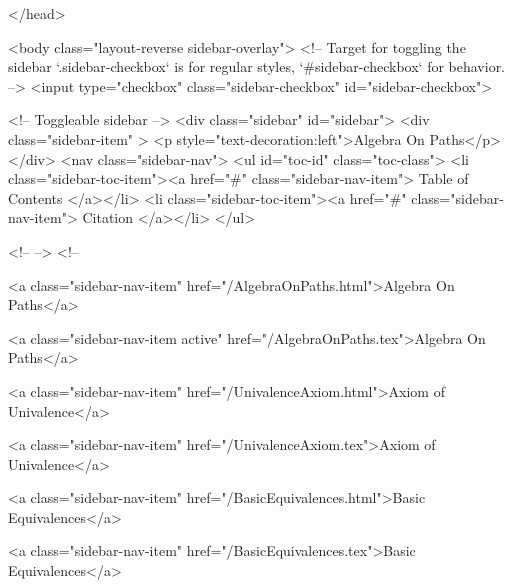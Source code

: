   
</head>




  <body class="layout-reverse sidebar-overlay">
    <!-- Target for toggling the sidebar `.sidebar-checkbox` is for regular
     styles, `#sidebar-checkbox` for behavior. -->
<input type="checkbox" class="sidebar-checkbox" id="sidebar-checkbox">

<!-- Toggleable sidebar -->
<div class="sidebar" id="sidebar">
  <div class="sidebar-item" >
    <p style="text-decoration:left">Algebra On Paths</p>
  </div>
  <nav class="sidebar-nav">
    <ul id="toc-id" class="toc-class">
  <li class="sidebar-toc-item"><a href="#" class="sidebar-nav-item"> Table of Contents </a></li>
  <li class="sidebar-toc-item"><a href="#" class="sidebar-nav-item"> Citation </a></li>
</ul>


    <!--  -->
    <!-- 
      
    
      
    
      
    
      
    
      
        
      
    
      
        
          <a class="sidebar-nav-item" href="/AlgebraOnPaths.html">Algebra On Paths</a>
        
      
    
      
        
          <a class="sidebar-nav-item active" href="/AlgebraOnPaths.tex">Algebra On Paths</a>
        
      
    
      
        
          <a class="sidebar-nav-item" href="/UnivalenceAxiom.html">Axiom of Univalence</a>
        
      
    
      
        
          <a class="sidebar-nav-item" href="/UnivalenceAxiom.tex">Axiom of Univalence</a>
        
      
    
      
        
          <a class="sidebar-nav-item" href="/BasicEquivalences.html">Basic Equivalences</a>
        
      
    
      
        
          <a class="sidebar-nav-item" href="/BasicEquivalences.tex">Basic Equivalences</a>
        
